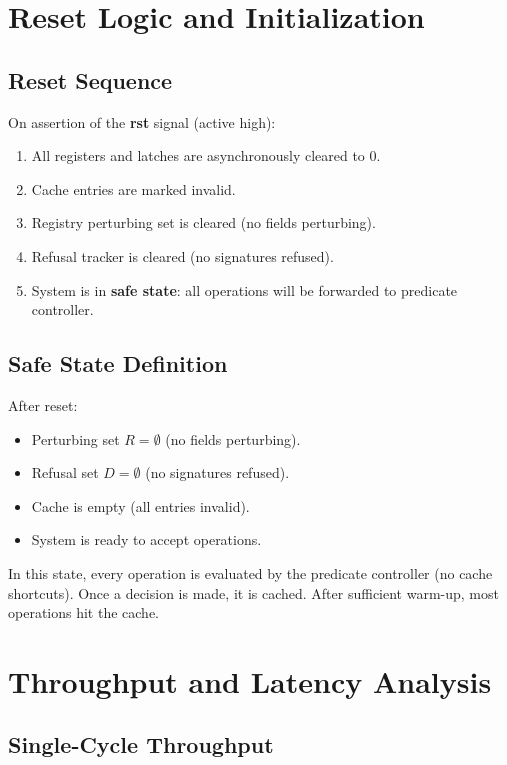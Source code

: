 \documentclass[11pt,oneside]{article}
\begin{document}
\section{Reset Logic and Initialization}

\subsection{Reset Sequence}

On assertion of the \textbf{rst} signal (active high):

\begin{enumerate}
\item All registers and latches are asynchronously cleared to 0.
\item Cache entries are marked invalid.
\item Registry perturbing set is cleared (no fields perturbing).
\item Refusal tracker is cleared (no signatures refused).
\item System is in \textbf{safe state}: all operations will be forwarded to predicate controller.
\end{enumerate}

\subsection{Safe State Definition}

After reset:
\begin{itemize}
\item Perturbing set $R = \emptyset$ (no fields perturbing).
\item Refusal set $D = \emptyset$ (no signatures refused).
\item Cache is empty (all entries invalid).
\item System is ready to accept operations.
\end{itemize}

In this state, every operation is evaluated by the predicate controller (no cache shortcuts). Once a decision is made, it is cached. After sufficient warm-up, most operations hit the cache.

\section{Throughput and Latency Analysis}

\subsection{Single-Cycle Throughput}
\end{document}
